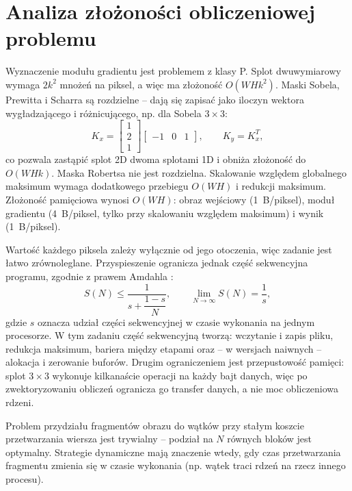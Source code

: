 \documentclass[12pt,a4paper]{article}
\begin{document}
\section{Analiza złożoności obliczeniowej problemu}

Wyznaczenie modułu gradientu jest problemem z klasy P. Splot dwuwymiarowy wymaga $2k^2$ mnożeń na piksel, a więc ma złożoność $O(W H k^{2})$. Maski Sobela, Prewitta i Scharra są rozdzielne -- dają się zapisać jako iloczyn wektora wygładzającego i różnicującego, np. dla Sobela $3\times3$:
\begin{equation}
	K_x = \begin{bmatrix} 1 \\ 2 \\ 1 \end{bmatrix} \begin{bmatrix} -1 & 0 & 1 \end{bmatrix},
	\qquad K_y = K_x^{T},
\end{equation}
co pozwala zastąpić splot 2D dwoma splotami 1D i obniża złożoność do $O(W H k)$. Maska Robertsa nie jest rozdzielna. Skalowanie względem globalnego maksimum wymaga dodatkowego przebiegu $O(W H)$ i redukcji maksimum. Złożoność pamięciowa wynosi $O(W H)$: obraz wejściowy (1~B/piksel), moduł gradientu (4~B/piksel, tylko przy skalowaniu względem maksimum) i wynik (1~B/piksel).

Wartość każdego piksela zależy wyłącznie od jego otoczenia, więc zadanie jest łatwo zrównoleglane. Przyspieszenie ogranicza jednak część sekwencyjna programu, zgodnie z prawem Amdahla \cite{amdahl,czech}:
\begin{equation}
	S(N) \le \frac{1}{s + \dfrac{1 - s}{N}}, \qquad \lim_{N \to \infty} S(N) = \frac{1}{s},
	\label{eq:amdahl}
\end{equation}
gdzie $s$ oznacza udział części sekwencyjnej w czasie wykonania na jednym procesorze. W tym zadaniu część sekwencyjną tworzą: wczytanie i zapis pliku, redukcja maksimum, bariera między etapami oraz -- w wersjach naiwnych -- alokacja i zerowanie buforów. Drugim ograniczeniem jest przepustowość pamięci: splot $3 \times 3$ wykonuje kilkanaście operacji na każdy bajt danych, więc po zwektoryzowaniu obliczeń ogranicza go transfer danych, a nie moc obliczeniowa rdzeni.

Problem przydziału fragmentów obrazu do wątków przy stałym koszcie przetwarzania wiersza jest trywialny -- podział na $N$ równych bloków jest optymalny. Strategie dynamiczne mają znaczenie wtedy, gdy czas przetwarzania fragmentu zmienia się w czasie wykonania (np. wątek traci rdzeń na rzecz innego procesu).
\end{document}
